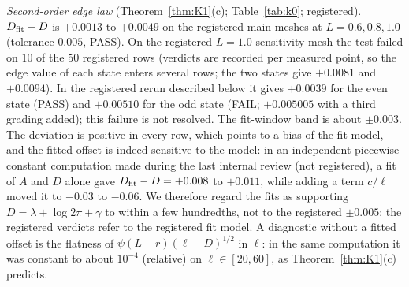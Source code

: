\documentclass[11pt]{amsart}
\theoremstyle{definition}
\theoremstyle{remark}
\numberwithin{equation}{section}
\begin{document}
\begin{table}[ht]\centering\footnotesize\setlength\tabcolsep{3pt}
\caption{Generation-$2$ kink constants (Theorem~\ref{thm:kink}, $k=2$; registered): predicted jump coefficient $1$, cusp $\frac15$ and side ratio $-\frac32$, i.e.\ the split $\frac35:-\frac25$, with chain weight $\mathsf W$ (column $W$). Same fits and bands as Table~\ref{tab:kink1}. Registered verdict: PASS $20/20$ (tolerances $0.01$, $0.004$, $0.015$). $^\dagger$Post-registration diagnostic. $^\ddagger$Registered rerun, primary meshes; PASS $2/2$. In the rerun the generation-$3$ point $L-\log\frac65$, coupled to $L-\log6$, is also graded.}\label{tab:kink2}

\end{table}

\emph{Second-order edge law} (Theorem~\ref{thm:K1}(c); Table~\ref{tab:k0}; registered). $D_{\rm fit}-D$ is $+0.0013$ to $+0.0049$ on the registered main meshes at $L=0.6,0.8,1.0$ (tolerance $0.005$, PASS). On the registered $L=1.0$ sensitivity mesh the test failed on $10$ of the $50$ registered rows (verdicts are recorded per measured point, so the edge value of each state enters several rows; the two states give $+0.0081$ and $+0.0094$). In the registered rerun described below it gives $+0.0039$ for the even state (PASS) and $+0.00510$ for the odd state (FAIL; $+0.005005$ with a third grading added); this failure is not resolved. The fit-window band is about $\pm0.003$. The deviation is positive in every row, which points to a bias of the fit model, and the fitted offset is indeed sensitive to the model: in an independent piecewise-constant computation made during the last internal review (not registered), a fit of $A$ and $D$ alone gave $D_{\rm fit}-D=+0.008$ to $+0.011$, while adding a term $c/\ell$ moved it to $-0.03$ to $-0.06$. We therefore regard the fits as supporting $D=\lambda+\log2\pi+\gamma$ to within a few hundredths, not to the registered $\pm0.005$; the registered verdicts refer to the registered fit model. A diagnostic without a fitted offset is the flatness of $\psi(L-r)(\ell-D)^{1/2}$ in $\ell$: in the same computation it was constant to about $10^{-4}$ (relative) on $\ell\in[20,60]$, as Theorem~\ref{thm:K1}(c) predicts.

\begin{table}[ht]\centering\footnotesize\setlength\tabcolsep{3pt}
\caption{Edge law to second order (Theorem~\ref{thm:K1}(c); registered): $D_{\rm fit}-D$, tolerance $0.005$, extrapolated in the grading ratio; $\pm$ is the systematic band. Mesh labels as in Table~\ref{tab:k5}. Both registered failures are shown: the $L=1.0$ sensitivity mesh, and the odd state of the rerun.}\label{tab:k0}

\end{table}
\end{document}
